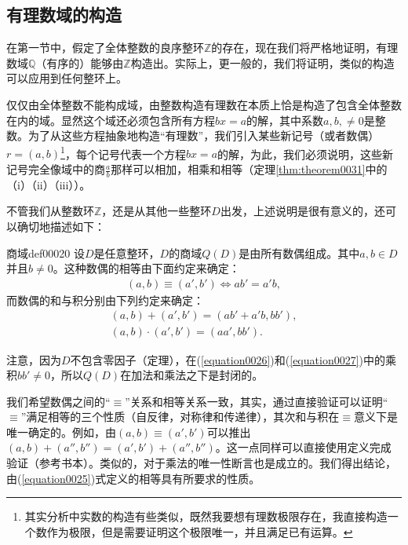 \subsection{有理数域的构造}\label{subsection00202}
在第一节中，假定了全体整数的良序整环$\mathbb{Z}$的存在，现在我们将严格地证明，有理数域$\mathbb{Q}$（有序的）能够由$\mathbb{Z}$构造出。实际上，更一般的，我们将证明，类似的构造可以应用到任何整环上。

仅仅由全体整数不能构成域，由整数构造有理数在本质上恰是构造了包含全体整数在内的域。显然这个域还必须包含所有方程$bx=a$的解，其中系数$a,b,\neq 0$是整数。为了从这些方程抽象地构造“有理数”，我们引入某些新记号（或者数偶）$r=(a,b)$\footnote{其实分析中实数的构造有些类似，既然我要想有理数极限存在，我直接构造一个数作为极限，但是需要证明这个极限唯一，并且满足已有运算。}，每个记号代表一个方程$bx=a$的解，为此，我们必须说明，这些新记号完全像域中的商$\frac{a}{b}$那样可以相加，相乘和相等（定理\ref{thm:theorem0031}中的（i）（ii）（iii））。

不管我们从整数环$\mathbb{Z}$，还是从其他一些整环$D$出发，上述说明是很有意义的，还可以确切地描述如下：
\begin{definition}{商域}{def00020}
设$D$是任意整环，$D$的商域$Q(D)$是由所有数偶组成。其中$a, b \in D$并且$b \neq 0$。这种数偶的相等由下面约定来确定：
\begin{gather}\label{equation0025}
(a,b) \equiv (a',b') \Leftrightarrow ab'=a'b,
\end{gather}
而数偶的和与积分别由下列约定来确定：
\begin{gather}
(a,b) + (a', b') = (ab'+a'b, bb'),\label{equation0026}\\
(a, b) \cdot (a', b') = (aa', bb').\label{equation0027}
\end{gather}
\end{definition}

注意，因为$D$不包含零因子（定理），在(\ref{equation0026})和(\ref{equation0027})中的乘积$bb' \neq 0$，所以$Q(D)$在加法和乘法之下是封闭的。

我们希望数偶之间的“$\equiv$”关系和相等关系一致，其实，通过直接验证可以证明“$\equiv$”满足相等的三个性质（自反律，对称律和传递律），其次和与积在$\equiv$意义下是唯一确定的。例如，由$(a,b) \equiv (a', b')$可以推出$(a, b)+(a'', b'')=(a',b')+(a'', b'')$。这一点同样可以直接使用定义完成验证（参考书本）。类似的，对于乘法的唯一性断言也是成立的。我们得出结论，由(\ref{equation0025})式定义的相等具有所要求的性质。

